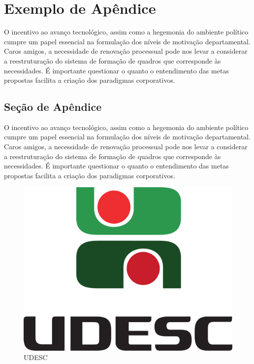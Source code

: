 \documentclass[a4paper,12pt]{udesc}
\begin{document}


\apendice

\chapter{Exemplo de Apêndice}

 O incentivo ao avanço tecnológico, assim como a hegemonia do ambiente político cumpre um papel essencial na formulação dos níveis de motivação departamental. Caros amigos, a necessidade de renovação processual pode nos levar a considerar a reestruturação do sistema de formação de quadros que corresponde às necessidades. É importante questionar o quanto o entendimento das metas propostas facilita a criação dos paradigmas corporativos. 
 
\section{Seção de Apêndice}

 O incentivo ao avanço tecnológico, assim como a hegemonia do ambiente político cumpre um papel essencial na formulação dos níveis de motivação departamental. Caros amigos, a necessidade de renovação processual pode nos levar a considerar a reestruturação do sistema de formação de quadros que corresponde às necessidades. É importante questionar o quanto o entendimento das metas propostas facilita a criação dos paradigmas corporativos. 
 
\begin{figure}[h]

\caption{UDESC}
\centering 
\includegraphics[scale=0.04]{fig/Marca_UDESC_vertical.pdf}

\end{figure}
\end{document}
